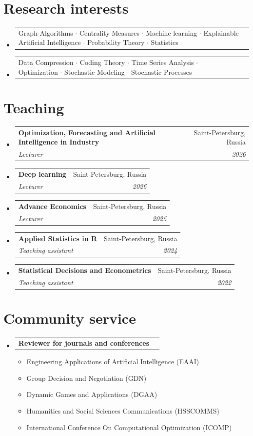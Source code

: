 \documentclass[letterpaper,10pt]{article}
\makeatletter
\newcommand{\resumeItem}[1]{
  \item\small{
    {#1 \vspace{-2pt}}
  }
}
\newcommand{\resumeSubheading}[4]{
  \vspace{-2pt}\item
  \begin{tabular*}{0.97\textwidth}[t]{l@{\extracolsep{\fill}}r}
    \textbf{#1} & #2 \\
    \textit{\small#3} & \textit{\small #4} \\
  \end{tabular*}\vspace{-7pt}
}
\newcommand{\resumeProjectHeading}[2]{
  \item
  \begin{tabular*}{0.97\textwidth}{l@{\extracolsep{\fill}}r}
    \small#1 & #2 \\
  \end{tabular*}\vspace{-7pt}
}
\newenvironment{resumeSubHeadingList}{\begin{itemize}[leftmargin=0.15in, label={}]}{\end{itemize}}
\newenvironment{resumeItemList}{\begin{itemize}}{\end{itemize}}
\makeatother
\begin{document}
\section{Research interests}
\begin{resumeSubHeadingList}
  \resumeProjectHeading{
    Graph Algorithms $\cdot$ Centrality Measures $\cdot$ Machine learning
    $\cdot$ Explainable Artificial Intelligence $\cdot$ Probability Theory
    $\cdot$ Statistics}{}
  \resumeProjectHeading{
    Data Compression $\cdot$ Coding Theory $\cdot$ Time Series Analysis $\cdot$
    Optimization $\cdot$ Stochastic Modeling $\cdot$ Stochastic Processes}{}
\end{resumeSubHeadingList}
\section{Teaching}
\begin{resumeSubHeadingList}
  \resumeSubheading{Optimization, Forecasting and Artificial Intelligence in
                    Industry}{Saint-Petersburg, Russia}{Lecturer}{2026}
  \resumeSubheading{Deep learning}{Saint-Petersburg, Russia}{Lecturer}{2026}
  \resumeSubheading{Advance Economics}{Saint-Petersburg,
                    Russia}{Lecturer}{2025}
  \resumeSubheading{Applied Statistics in R}{Saint-Petersburg, Russia}{Teaching
                    assistant}{2024}
  \resumeSubheading{Statistical Decisions and Econometrics}{Saint-Petersburg,
                    Russia}{Teaching assistant}{2022}
\end{resumeSubHeadingList}
\section{Community service}
\begin{resumeSubHeadingList}
  \resumeProjectHeading{{\bf Reviewer for journals and conferences}}{}
  \begin{resumeItemList}
    \resumeItem{Engineering Applications of Artificial Intelligence (EAAI)}
    \resumeItem{Group Decision and Negotiation (GDN)}
    \resumeItem{Dynamic Games and Applications (DGAA)}
    \resumeItem{Humanities and Social Sciences Communications (HSSCOMMS)}
    \resumeItem{International Conference On Computational Optimization (ICOMP)}
  \end{resumeItemList}
\end{resumeSubHeadingList}
\end{document}
